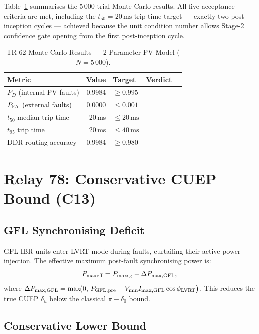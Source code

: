 \documentclass[journal,twoside]{IEEEtran}
\newcommand{\cmark}{\ding{51}}
\begin{document}
Table~\ref{tab:pv_mc} summarises the 5\,000-trial Monte Carlo results.
All five acceptance criteria are met, including the $t_{50} = 20\,\text{ms}$
trip-time target --- exactly two post-inception cycles --- achieved because the
unit condition number allows Stage-2 confidence gate opening from the first
post-inception cycle.

\begin{table}[h]
  \centering
  \caption{TR-62 Monte Carlo Results --- 2-Parameter PV Model ($N = 5\,000$).}
  \label{tab:pv_mc}
  \begin{tabular}{@{}lrlll@{}}
    \toprule
    Metric & Value & Target & Verdict \\
    \midrule
    $P_D$ (internal PV faults) & 0.9984 & $\geq 0.995$ & \cmark \\
    $P_{\rm FA}$ (external faults) & 0.0000 & $\leq 0.001$ & \cmark \\
    $t_{50}$ median trip time & 20\,ms & $\leq 20\,\text{ms}$ & \cmark \\
    $t_{95}$ trip time & 20\,ms & $\leq 40\,\text{ms}$ & \cmark \\
    DDR routing accuracy & 0.9984 & $\geq 0.980$ & \cmark \\
    \bottomrule
  \end{tabular}
\end{table}

\section{Relay 78: Conservative CUEP Bound (C13)}
\label{sec:relay78}

\subsection{GFL Synchronising Deficit}

GFL IBR units enter LVRT mode during faults, curtailing their active-power
injection.
The effective maximum post-fault synchronising power is:
\begin{equation}
  P_{\rm maxeff} = P_{\rm maxsg} - \Delta P_{\rm max,GFL},
  \label{eq:pmaxeff}
\end{equation}
where $\Delta P_{\rm max,GFL} = \max\!\bigl(0,\,P_{\rm GFL,pre}
- V_{\rm min} I_{\rm max,GFL}\cos\phi_{\rm LVRT}\bigr)$.
This reduces the true CUEP $\delta_u$ below the classical
$\pi - \delta_0$ bound.

\subsection{Conservative Lower Bound}
\end{document}
